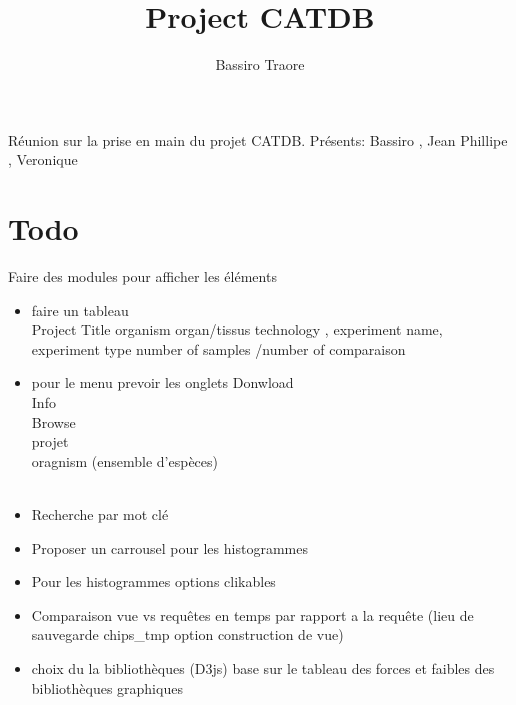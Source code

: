 \documentclass[12pt]{article}
\begin{document}
 
 
\title{Project CATDB}
\author{Bassiro Traore\\ %
}

\maketitle

R\'{e}union sur la prise en main du projet CATDB.
Pr\'{e}sents: Bassiro , Jean Phillipe , Veronique
 

\section{Todo}
Faire des modules pour afficher les éléments

\begin{itemize}
\item faire un tableau \\
Project Title organism organ/tissus technology , experiment name, experiment type number of samples /number of comparaison \\



\item pour le menu prevoir  les onglets  Donwload
                    \\
					Info \\
				      Browse \\
					projet \\
				      oragnism (ensemble d'esp\`{e}ces) \\
				      \\

\item Recherche par mot clé  \\

\item Proposer un carrousel pour les histogrammes \\
\item Pour les histogrammes options clikables  \\
\item Comparaison vue vs requ\^{e}tes en temps par rapport a la requête  (lieu de sauvegarde chips\_tmp option construction de vue) \\

\item choix du la biblioth\`{e}ques (D3js) base sur le tableau des forces et faibles des biblioth\`{e}ques graphiques 
\end{itemize}
\end{document}
